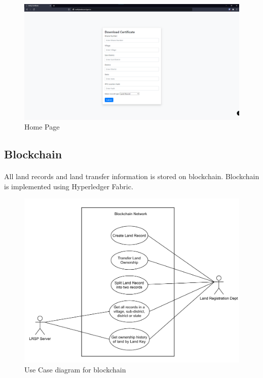 \documentclass{article}
\begin{document}
        \begin{figure}[H]
                \includegraphics[scale=0.25]{verification_home.png}
                \centering
                \caption{Home Page}
        \end{figure}

    \subsection{Blockchain}
        \paragraph{}
        All land records and land transfer information is stored on blockchain. Blockchain is implemented using Hyperledger Fabric.

        \begin{figure}[htbp]
            \includegraphics[scale=0.25]{blockchain_use_cases}
            \centering
            \caption{Use Case diagram for blockchain}
            \label{fig:bl_use_case}
        \end{figure}
\end{document}
